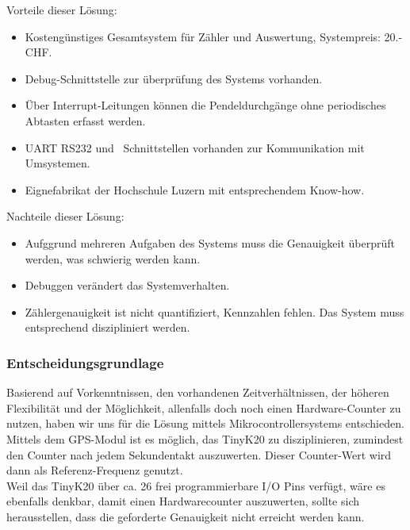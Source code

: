     	Vorteile dieser Lösung:
    	\begin{itemize}
    		\item Kostengünstiges Gesamtsystem für Zähler und Auswertung, Systempreis: 20.- CHF.
    		\item Debug-Schnittstelle zur überprüfung des Systems vorhanden.
    		\item Über Interrupt-Leitungen können die Pendeldurchgänge ohne periodisches Abtasten erfasst werden.
    		\item UART RS232 und \iic\ Schnittstellen vorhanden zur Kommunikation mit Umsystemen.
    		\item Eignefabrikat der Hochschule Luzern mit entsprechendem Know-how.
    	\end{itemize}
    	Nachteile dieser Lösung:
    	\begin{itemize}
    		\item Aufggrund mehreren Aufgaben des Systems muss die Genauigkeit überprüft werden, was schwierig werden kann.
    		\item Debuggen verändert das Systemverhalten.
    		\item Zählergenauigkeit ist nicht quantifiziert, Kennzahlen fehlen. Das System muss entsprechend diszipliniert werden.
    	\end{itemize}
    \subsubsection{Entscheidungsgrundlage}
		Basierend auf Vorkenntnissen, den vorhandenen Zeitverhältnissen, der höheren Flexibilität und der Möglichkeit, allenfalls doch noch einen Hardware-Counter zu nutzen, haben wir uns für die Lösung mittels Mikrocontrollersystems entschieden. Mittels dem GPS-Modul ist es möglich, das TinyK20 zu disziplinieren, zumindest den Counter nach jedem Sekundentakt auszuwerten. Dieser Counter-Wert wird dann als Referenz-Frequenz genutzt.\\
		Weil das TinyK20 über ca. 26 frei programmierbare I/O Pins verfügt, wäre es ebenfalls denkbar, damit einen Hardwarecounter auszuwerten, sollte sich herausstellen, dass die geforderte Genauigkeit nicht erreicht werden kann.
%
%
\clearpage
